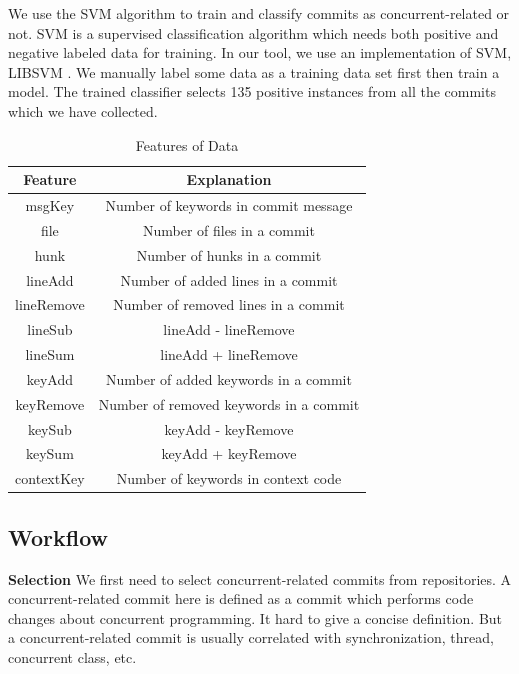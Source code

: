 We use the SVM \cite{journals/ml/CortesV95} algorithm to train and classify commits as concurrent-related or not. SVM is a supervised classification algorithm which needs both positive and negative labeled data for training. In our tool, we use an implementation of SVM, LIBSVM \cite{libsvm}. We manually label some data as a training data set first then train a model. The trained classifier selects 135 positive instances from all the commits which we have collected.

\begin{table}
	\centering
	\caption{Features of Data}
	\begin{tabular}{|c|c|}\hline
		Feature&Explanation\\\hline
		msgKey&Number of keywords in commit message\\\hline
		file&Number of files in a commit\\\hline
		hunk&Number of hunks in a commit\\\hline
		lineAdd&Number of added lines in a commit\\\hline
		lineRemove&Number of removed lines in a commit\\\hline
		lineSub&lineAdd - lineRemove\\\hline
		lineSum&lineAdd + lineRemove\\\hline
		keyAdd&Number of added keywords in a commit\\\hline
		keyRemove&Number of removed keywords in a commit\\\hline
		keySub&keyAdd - keyRemove\\\hline
		keySum&keyAdd + keyRemove\\\hline
		contextKey&Number of keywords in context code\\\hline
	\end{tabular}
\end{table}

\subsection{Workflow}

\textbf{Selection} We first need to select concurrent-related commits from repositories. A concurrent-related commit here is defined as a commit which performs code changes about concurrent programming. It hard to give a concise definition. But a concurrent-related commit is usually correlated with synchronization, thread, concurrent class, etc.

\textbf{}

